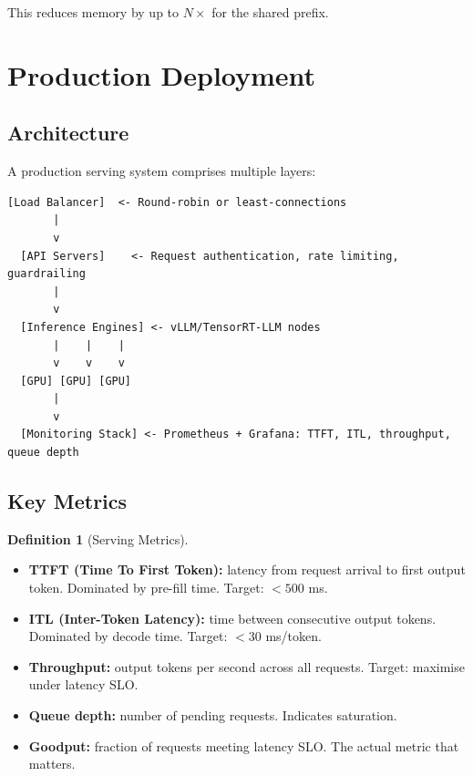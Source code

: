 \documentclass[11pt,a4paper]{article}
\theoremstyle{definition}
\newtheorem{definition}{Definition}[section]
\begin{document}
This reduces memory by up to $N\times$ for the shared prefix.

\section{Production Deployment}
\label{sec:production}

\subsection{Architecture}

A production serving system comprises multiple layers:

\begin{lstlisting}[caption=Production LLM serving architecture]
  [Load Balancer]  <- Round-robin or least-connections
       |
       v
  [API Servers]    <- Request authentication, rate limiting, guardrailing
       |
       v
  [Inference Engines] <- vLLM/TensorRT-LLM nodes
       |    |    |
       v    v    v
  [GPU] [GPU] [GPU]
       |
       v
  [Monitoring Stack] <- Prometheus + Grafana: TTFT, ITL, throughput, queue depth
\end{lstlisting}

\subsection{Key Metrics}

\begin{definition}[Serving Metrics]
	\begin{itemize}
		\item \textbf{TTFT (Time To First Token):} latency from request arrival to first output token. Dominated by pre-fill time. Target: $< 500$ ms.
		\item \textbf{ITL (Inter-Token Latency):} time between consecutive output tokens. Dominated by decode time. Target: $< 30$ ms/token.
		\item \textbf{Throughput:} output tokens per second across all requests. Target: maximise under latency SLO.
		\item \textbf{Queue depth:} number of pending requests. Indicates saturation.
		\item \textbf{Goodput:} fraction of requests meeting latency SLO. The actual metric that matters.
	\end{itemize}
\end{definition}
\end{document}
